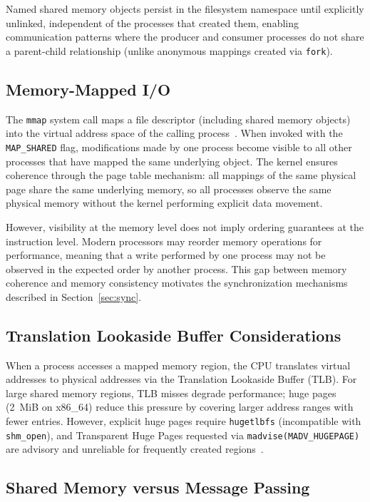 Named shared memory objects persist in the filesystem namespace until explicitly unlinked, independent of the processes that created them, enabling communication patterns where the producer and consumer processes do not share a parent-child relationship (unlike anonymous mappings created via \texttt{fork}).

\subsection{Memory-Mapped I/O}

The \texttt{mmap} system call maps a file descriptor (including shared memory objects) into the virtual address space of the calling process~\cite{kerrisk2010}. When invoked with the \texttt{MAP\_SHARED} flag, modifications made by one process become visible to all other processes that have mapped the same underlying object. The kernel ensures coherence through the page table mechanism: all mappings of the same physical page share the same underlying memory, so all processes observe the same physical memory without the kernel performing explicit data movement.

However, visibility at the memory level does not imply ordering guarantees at the instruction level. Modern processors may reorder memory operations for performance, meaning that a write performed by one process may not be observed in the expected order by another process. This gap between memory coherence and memory consistency motivates the synchronization mechanisms described in Section~\ref{sec:sync}.

\subsection{Translation Lookaside Buffer Considerations}

When a process accesses a mapped memory region, the CPU translates virtual addresses to physical addresses via the Translation Lookaside Buffer (TLB). For large shared memory regions, TLB misses degrade performance; huge pages (2~MiB on x86\_64) reduce this pressure by covering larger address ranges with fewer entries. However, explicit huge pages require \texttt{hugetlbfs} (incompatible with \texttt{shm\_open}), and Transparent Huge Pages requested via \texttt{madvise(MADV\_HUGEPAGE)} are advisory and unreliable for frequently created regions~\cite{thp_kernel_docs}.

\subsection{Shared Memory versus Message Passing}

